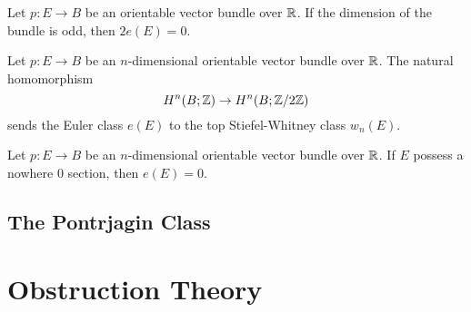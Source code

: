 \documentclass[a4paper]{article}
\begin{document}
\begin{prp} Let $p:E\to B$ be an orientable vector bundle over $\mathbb{R}$. If the dimension of the bundle is odd, then $2e(E)=0$. 
\end{prp}

\begin{prp}{}{} Let $p:E\to B$ be an $n$-dimensional orientable vector bundle over $\mathbb{R}$. The natural homomorphism $$H^n(B;\mathbb{Z})\to H^n(B;\mathbb{Z}/2\mathbb{Z})$$ sends the Euler class $e(E)$ to the top Stiefel-Whitney class $w_n(E)$. 
\end{prp}

\begin{prp}{}{} Let $p:E\to B$ be an $n$-dimensional orientable vector bundle over $\mathbb{R}$. If $E$ possess a nowhere $0$ section, then $e(E)=0$. 
\end{prp}

\subsection{The Pontrjagin Class}

\pagebreak
\section{Obstruction Theory}
\end{document}

